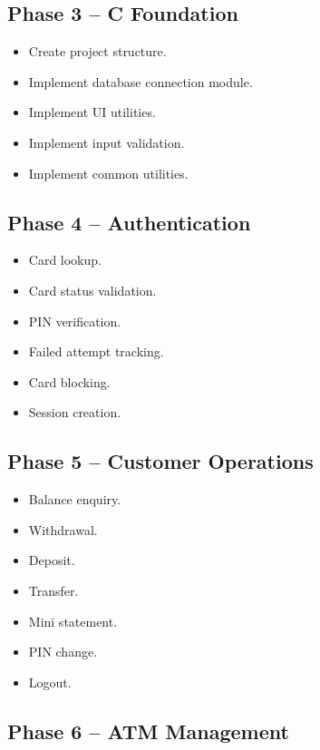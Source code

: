 \documentclass[12pt,a4paper]{article}
\begin{document}
\subsection{Phase 3 -- C Foundation}

\begin{itemize}
    \item Create project structure.
    \item Implement database connection module.
    \item Implement UI utilities.
    \item Implement input validation.
    \item Implement common utilities.
\end{itemize}

\subsection{Phase 4 -- Authentication}

\begin{itemize}
    \item Card lookup.
    \item Card status validation.
    \item PIN verification.
    \item Failed attempt tracking.
    \item Card blocking.
    \item Session creation.
\end{itemize}

\subsection{Phase 5 -- Customer Operations}

\begin{itemize}
    \item Balance enquiry.
    \item Withdrawal.
    \item Deposit.
    \item Transfer.
    \item Mini statement.
    \item PIN change.
    \item Logout.
\end{itemize}

\subsection{Phase 6 -- ATM Management}
\end{document}
